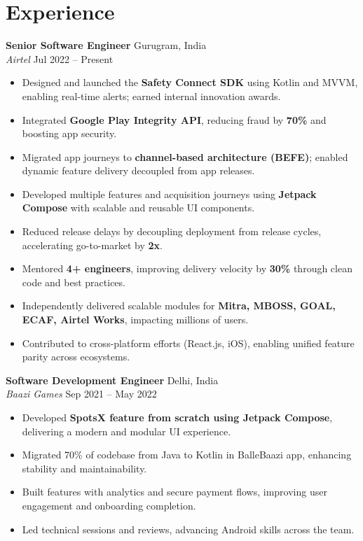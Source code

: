 \documentclass[a4paper,10pt]{article}
\begin{document}
\section*{Experience}

\textbf{Senior Software Engineer} \hfill Gurugram, India \\
\textit{Airtel} \hfill \textcolor{secondary}{Jul 2022 -- Present}
\begin{itemize}[left=0pt, label=\textbullet, itemsep=4pt]
    \item Designed and launched the \textbf{Safety Connect SDK} using Kotlin and MVVM, enabling real-time alerts; earned internal innovation awards.
    \item Integrated \textbf{Google Play Integrity API}, reducing fraud by \textbf{70\%} and boosting app security.
    \item Migrated app journeys to \textbf{channel-based architecture (BEFE)}; enabled dynamic feature delivery decoupled from app releases.
    \item Developed multiple features and acquisition journeys using \textbf{Jetpack Compose} with scalable and reusable UI components.
    \item Reduced release delays by decoupling deployment from release cycles, accelerating go-to-market by \textbf{2x}.
    \item Mentored \textbf{4+ engineers}, improving delivery velocity by \textbf{30\%} through clean code and best practices.
    \item Independently delivered scalable modules for \textbf{Mitra, MBOSS, GOAL, ECAF, Airtel Works}, impacting millions of users.
    \item Contributed to cross-platform efforts (React.js, iOS), enabling unified feature parity across ecosystems.
\end{itemize}


\textbf{Software Development Engineer} \hfill Delhi, India \\
\textit{Baazi Games} \hfill \textcolor{secondary}{Sep 2021 -- May 2022}
\begin{itemize}[left=0pt, label=\textbullet, itemsep=4pt]
    \item Developed \textbf{SpotsX feature from scratch using Jetpack Compose}, delivering a modern and modular UI experience.
    \item Migrated 70\% of codebase from Java to Kotlin in BalleBaazi app, enhancing stability and maintainability.
    \item Built features with analytics and secure payment flows, improving user engagement and onboarding completion.
    \item Led technical sessions and reviews, advancing Android skills across the team.
\end{itemize}
\end{document}
